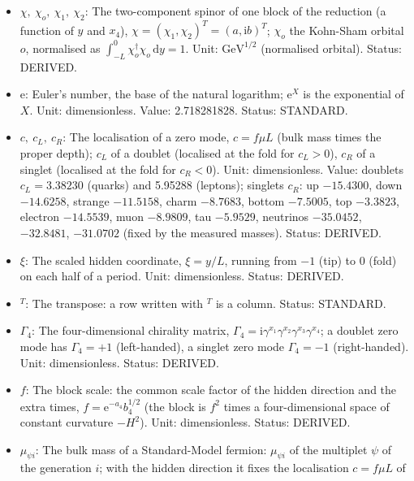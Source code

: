\documentclass[
  10pt,
]{article}
\providecommand{\tightlist}{%
  \setlength{\itemsep}{0pt}\setlength{\parskip}{0pt}}
\begin{document}
\begin{itemize}
\tightlist
\item
  \(\chi,\ \chi_o,\ \chi_1,\ \chi_2\): The two-component spinor of one
  block of the reduction (a function of \(y\) and \(x_4\)),
  \(\chi = (\chi_1, \chi_2)^T = (a, \mathrm{i}b)^T\); \(\chi_o\) the
  Kohn-Sham orbital \(o\), normalised as
  \(\int_{-L}^{0}\chi_o^\dagger\chi_o\,\mathrm{d}y = 1\). Unit:
  \(\mathrm{GeV}^{1/2}\) (normalised orbital). Status: DERIVED.
\item
  \(\mathrm{e}\): Euler's number, the base of the natural logarithm;
  \(\mathrm{e}^{X}\) is the exponential of \(X\). Unit: dimensionless.
  Value: 2.718281828. Status: STANDARD.
\item
  \(c,\ c_L,\ c_R\): The localisation of a zero mode, \(c = f\mu L\)
  (bulk mass times the proper depth); \(c_L\) of a doublet (localised at
  the fold for \(c_L > 0\)), \(c_R\) of a singlet (localised at the fold
  for \(c_R < 0\)). Unit: dimensionless. Value: doublets
  \(c_L = 3.38230\) (quarks) and 5.95288 (leptons); singlets \(c_R\): up
  \(-15.4300\), down \(-14.6258\), strange \(-11.5158\), charm
  \(-8.7683\), bottom \(-7.5005\), top \(-3.3823\), electron
  \(-14.5539\), muon \(-8.9809\), tau \(-5.9529\), neutrinos
  \(-35.0452\), \(-32.8481\), \(-31.0702\) (fixed by the measured
  masses). Status: DERIVED.
\item
  \(\xi\): The scaled hidden coordinate, \(\xi = y/L\), running from
  \(-1\) (tip) to \(0\) (fold) on each half of a period. Unit:
  dimensionless. Status: DERIVED.
\item
  \({}^T\): The transpose: a row written with \(^T\) is a column.
  Status: STANDARD.
\item
  \(\Gamma_4\): The four-dimensional chirality matrix,
  \(\Gamma_4 = \mathrm{i}\gamma^{x_1}\gamma^{x_2}\gamma^{x_3}\gamma^{x_4}\);
  a doublet zero mode has \(\Gamma_4 = +1\) (left-handed), a singlet
  zero mode \(\Gamma_4 = -1\) (right-handed). Unit: dimensionless.
  Status: DERIVED.
\item
  \(f\): The block scale: the common scale factor of the hidden
  direction and the extra times, \(f = \mathrm{e}^{-a_4}b_4^{1/2}\) (the
  block is \(f^2\) times a four-dimensional space of constant curvature
  \(-H^2\)). Unit: dimensionless. Status: DERIVED.
\item
  \(\mu_{\psi i}\): The bulk mass of a Standard-Model fermion:
  \(\mu_{\psi i}\) of the multiplet \(\psi\) of the generation \(i\);
  with the hidden direction it fixes the localisation \(c = f\mu L\) of

\end{itemize}
\end{document}
